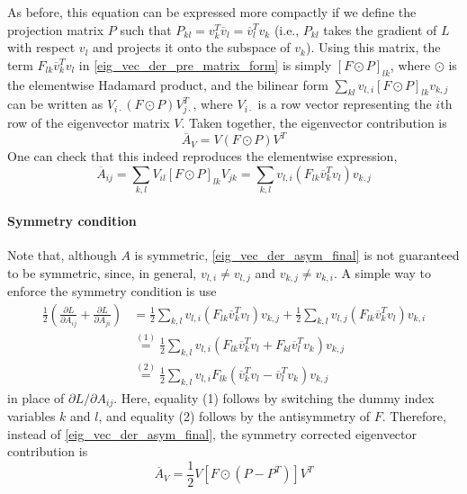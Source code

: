 \documentclass[11pt, a4paper]{article}
\begin{document}
As before, this equation can be expressed more compactly if we define the projection matrix $P$ such that $P_{kl}= v_k^T\overline{v}_l=\overline{v}_l^Tv_k$ (i.e., $P_{kl}$ takes the gradient of $L$ with respect $v_l$ and projects it onto the subspace of $v_k$). Using this matrix, the term $F_{lk}\overline{v}_k^Tv_l$ in \eqref{eig_vec_der_pre_matrix_form} is simply $[F\odot P]_{lk}$, where $\odot$ is the elementwise Hadamard product, and the bilinear form $\sum_{kl}v_{l,i}[F\odot P]_{lk}v_{k,j}$ can be written as $V_{i\cdot}(F\odot P)V_{j\cdot}^T$, where $V_{i\cdot}$ is a row vector representing the $i$th row of the eigenvector matrix $V$. Taken together, the eigenvector contribution is
\begin{equation}
    \overline{A}_V = V(F\odot P)V^T \label{eig_vec_der_asym_final}
\end{equation}
One can check that this indeed reproduces the elementwise expression,
\begin{equation}
    \overline{A}_{ij} = \sum_{k,l} V_{il}[F\odot P]_{lk}V_{jk} = \sum_{k,l} v_{l,i}(F_{lk}\overline{v}_k^Tv_l)v_{k,j} 
\end{equation}

\paragraph{Symmetry condition}
Note that, although $A$ is symmetric, \eqref{eig_vec_der_asym_final} is not guaranteed to be symmetric, since, in general, $v_{l,i} \ne v_{l,j}$ and $v_{k,j}\ne v_{k,i}$. A simple way to enforce the symmetry condition is use 
\begin{align}
    \frac 1 2 \left(\frac{\partial L}{\partial A_{ij}} + \frac{\partial L}{\partial A_{ji}}\right) & = \frac 1 2 \sum_{k,l} v_{l,i}(F_{lk}\overline{v}_k^Tv_l)v_{k,j} + \frac 1 2 \sum_{k,l} v_{l,j}(F_{lk}\overline{v}_k^Tv_l)v_{k,i} \\ & \overset{(1)}{=} \frac 1 2 \sum_{k,l}v_{l,i}(F_{lk}\overline{v}_k^Tv_l + F_{kl}\overline{v}_l^Tv_k)v_{k,j} \\ & \overset{(2)}{=} \frac 1 2 \sum_{k,l}v_{l,i}F_{lk}(\overline{v}_k^Tv_l - \overline{v}_l^Tv_k)v_{k,j}
\end{align}
in place of $\partial L/\partial A_{ij}$. Here, equality (1) follows by switching the dummy index variables $k$ and $l$, and equality (2) follows by the antisymmetry of $F$. Therefore, instead of \eqref{eig_vec_der_asym_final}, the symmetry corrected eigenvector contribution is
\begin{equation}
\boxed{
    \overline{A}_V = \frac 1 2 V\left[F \odot (P - P^T)\right]V^T
    \label{dLdA_via_eigenvectors_sym}
}
\end{equation}
\end{document}
